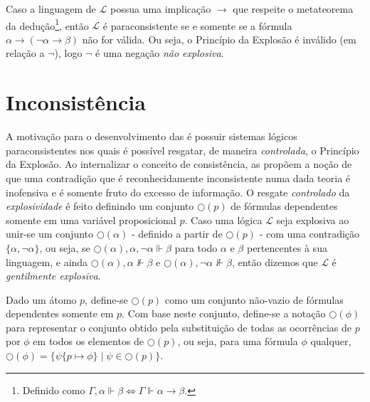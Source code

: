 Caso a linguagem de $\mathcal{L}$ possua uma implicação $\rightarrow$ que respeite o metateorema da dedução\footnote{Definido como $\Gamma, \alpha \Vdash \beta \Longleftrightarrow  \Gamma\Vdash \alpha \rightarrow \beta$.}, então $\mathcal{L}$ é paraconsistente se e somente se a fórmula $\alpha \rightarrow (\neg \alpha \rightarrow \beta)$ não for válida. Ou seja, o Princípio da Explosão é inválido (em relação a $\neg$), logo $\neg$ é uma negação \textit{não explosiva}.

\section{Inconsistência}
\label{sec:incons}
A motivação para o desenvolvimento das \lfis{} é possuir sistemas lógicos paraconsistentes nos quais é possível resgatar, de maneira \textit{controlada}, o Princípio da Explosão. Ao internalizar o conceito de consistência, as \lfis{} propõem a noção de que uma contradição que é reconhecidamente inconsistente numa dada teoria é inofensiva e é somente fruto do excesso de informação. O resgate \textit{controlado} da \textit{explosividade} é feito definindo um conjunto $\bigcirc(p)$ de fórmulas dependentes somente em uma variável proposicional $p$. Caso uma lógica $\mathcal{L}$ seja explosiva ao unir-se um conjunto $\bigcirc(\alpha)$ {-} definido a partir de $\bigcirc(p)$ {-} com uma contradição $\{\alpha, \neg \alpha\}$, ou seja, se $\bigcirc(\alpha), \alpha, \neg \alpha \Vdash \beta$ para todo $\alpha$ e $\beta$ pertencentes à sua linguagem, e ainda $\bigcirc(\alpha), \alpha \nVdash \beta$ e $\bigcirc(\alpha), \neg \alpha \nVdash \beta$, então dizemos que $\mathcal{L}$ é \textit{gentilmente explosiva}.

\begin{notacao}
    Dado um átomo $p$, define-se $\bigcirc(p)$ como um conjunto não-vazio de fórmulas dependentes somente em $p$. Com base neste conjunto, define-se a notação $\bigcirc(\phi)$ para representar o conjunto obtido pela substituição de todas as ocorrências de $p$ por $\phi$ em todos os elementos de $\bigcirc(p)$, ou seja, para uma fórmula $\phi$ qualquer, $\bigcirc(\phi) = \{\psi\{p \mapsto \phi\} \; | \; \psi \in \bigcirc(p)\}$.
\end{notacao}



